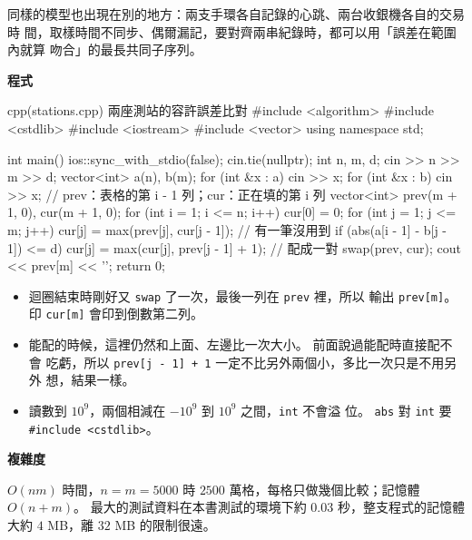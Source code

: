 同樣的模型也出現在別的地方：兩支手環各自記錄的心跳、兩台收銀機各自的交易時
間，取樣時間不同步、偶爾漏記，要對齊兩串紀錄時，都可以用「誤差在範圍內就算
吻合」的最長共同子序列。

\textbf{程式}

\begin{example}[label=ex:ss-stations]{cpp}{(stations.cpp) 兩座測站的容許誤差比對}
#include <algorithm>
#include <cstdlib>
#include <iostream>
#include <vector>
using namespace std;

int main() {
    ios::sync_with_stdio(false);
    cin.tie(nullptr);
    int n, m, d;
    cin >> n >> m >> d;
    vector<int> a(n), b(m);
    for (int &x : a) {
        cin >> x;
    }
    for (int &x : b) {
        cin >> x;
    }
    // prev：表格的第 i - 1 列；cur：正在填的第 i 列
    vector<int> prev(m + 1, 0), cur(m + 1, 0);
    for (int i = 1; i <= n; i++) {
        cur[0] = 0;
        for (int j = 1; j <= m; j++) {
            cur[j] = max(prev[j], cur[j - 1]);       // 有一筆沒用到
            if (abs(a[i - 1] - b[j - 1]) <= d) {
                cur[j] = max(cur[j], prev[j - 1] + 1);   // 配成一對
            }
        }
        swap(prev, cur);
    }
    cout << prev[m] << '\n';
    return 0;
}
\end{example}


\begin{itemize}
\item 迴圈結束時剛好又 \texttt{swap} 了一次，最後一列在 \texttt{prev} 裡，所以
輸出 \texttt{prev[m]}。 印 \texttt{cur[m]} 會印到倒數第二列。
\item 能配的時候，這裡仍然和上面、左邊比一次大小。 前面說過能配時直接配不會
吃虧，所以 \texttt{prev[j - 1] + 1} 一定不比另外兩個小，多比一次只是不用另外
想，結果一樣。
\item 讀數到 $10^9$，兩個相減在 $-10^9$ 到 $10^9$ 之間，\texttt{int} 不會溢
位。 \texttt{abs} 對 \texttt{int} 要 \texttt{\#include <cstdlib>}。
\end{itemize}

\textbf{複雜度}

$O(nm)$ 時間，$n = m = 5000$ 時 $2500$ 萬格，每格只做幾個比較；記憶體
$O(n + m)$。 最大的測試資料在本書測試的環境下約 $0.03$ 秒，整支程式的記憶體
大約 $4$ MB，離 $32$ MB 的限制很遠。

